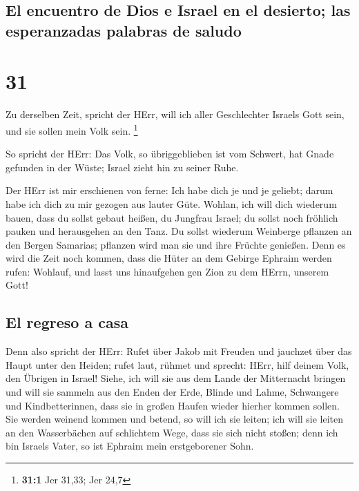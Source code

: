 \hypertarget{el-encuentro-de-dios-e-israel-en-el-desierto-las-esperanzadas-palabras-de-saludo}{%
\subsection{El encuentro de Dios e Israel en el desierto; las
esperanzadas palabras de
saludo}\label{el-encuentro-de-dios-e-israel-en-el-desierto-las-esperanzadas-palabras-de-saludo}}

\hypertarget{section-30}{%
\section{31}\label{section-30}}

 Zu derselben Zeit, spricht der HErr, will ich aller
Geschlechter Israels Gott sein, und sie sollen mein Volk sein.
\footnote{\textbf{31:1} Jer 31,33; Jer 24,7}

 So spricht der HErr: Das Volk, so übriggeblieben ist vom
Schwert, hat Gnade gefunden in der Wüste; Israel zieht hin zu seiner
Ruhe.

 Der HErr ist mir erschienen von ferne: Ich habe dich je
und je geliebt; darum habe ich dich zu mir gezogen aus lauter Güte.
 Wohlan, ich will dich wiederum bauen, dass du sollst
gebaut heißen, du Jungfrau Israel; du sollst noch fröhlich pauken und
herausgehen an den Tanz.  Du sollst wiederum Weinberge
pflanzen an den Bergen Samarias; pflanzen wird man sie und ihre Früchte
genießen.  Denn es wird die Zeit noch kommen, dass die
Hüter an dem Gebirge Ephraim werden rufen: Wohlauf, und lasst uns
hinaufgehen gen Zion zu dem HErrn, unserem Gott!

\hypertarget{el-regreso-a-casa}{%
\subsection{El regreso a casa}\label{el-regreso-a-casa}}

 Denn also spricht der HErr: Rufet über Jakob mit Freuden
und jauchzet über das Haupt unter den Heiden; rufet laut, rühmet und
sprecht: HErr, hilf deinem Volk, den Übrigen in Israel! 
Siehe, ich will sie aus dem Lande der Mitternacht bringen und will sie
sammeln aus den Enden der Erde, Blinde und Lahme, Schwangere und
Kindbetterinnen, dass sie in großen Haufen wieder hierher kommen sollen.
 Sie werden weinend kommen und betend, so will ich sie
leiten; ich will sie leiten an den Wasserbächen auf schlichtem Wege,
dass sie sich nicht stoßen; denn ich bin Israels Vater, so ist Ephraim
mein erstgeborener Sohn.

